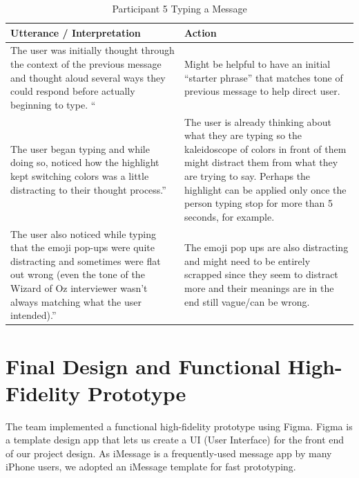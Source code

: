 \documentclass[acmsmall,screen,authorversion,nonacm]{acmart}
\begin{document}
\begin{table}[H]
\begin{tabular}{|p{0.5 \linewidth}|p{0.5 \linewidth}|}
\hline
Utterance / Interpretation & Action                                               \\ \hline
The user was initially thought through
the context of the previous message
and thought aloud several ways they
could respond before actually
beginning to type. `` & Might be helpful to have an
initial “starter phrase” that
matches tone of previous
message to help direct user.                                 
\\ \hline
The user began typing and
while doing so, noticed how
the highlight kept switching
colors was a little distracting to
their thought process.'' & The user is already thinking about what
they are typing so the kaleidoscope of colors
in front of them might distract them from what
they are trying to say. Perhaps the highlight
can be applied only once the person typing
stop for more than 5 seconds, for example.
\\ \hline
The user also noticed while
typing that the emoji pop-ups
were quite distracting and
sometimes were flat out wrong
(even the tone of the Wizard of Oz interviewer wasn’t always
matching what the user
intended).'' & The emoji pop ups are also distracting and
might need to be entirely scrapped since they
seem to distract more and their meanings are
in the end still vague/can be wrong.
\\ \hline
\end{tabular}
\caption{Participant 5 Typing a Message}
\label{tab:SimpUser5Task2}
\end{table}


\section{Final Design and Functional High-Fidelity Prototype}
\label{sec:final_design}

The team implemented a functional high-fidelity prototype using Figma. Figma is a template design app that lets us create a UI (User Interface) for the front end of our project design. As iMessage is a frequently-used message app by many iPhone users, we adopted an iMessage template for fast prototyping. 
\end{document}
